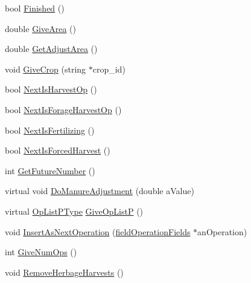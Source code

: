 \begin{DoxyCompactItemize}
\item 
bool \hyperlink{classplan_a336d1b751be876cf584e47d44826d8ac}{Finished} ()
\item 
double \hyperlink{classplan_a69ef07aba789edb9d649427e73dcc19c}{GiveArea} ()
\item 
double \hyperlink{classplan_aeac34b2dea2e779cf73477c0f9f263bb}{GetAdjustArea} ()
\item 
void \hyperlink{classplan_a46ca446bb7d23eff9d7f39d36b56d58b}{GiveCrop} (string $\ast$crop\_\-id)
\item 
bool \hyperlink{classplan_ad3c70afeed1b7ed1d00046ebbe3db961}{NextIsHarvestOp} ()
\item 
bool \hyperlink{classplan_aee2a49d25d0d0d0019d0b55465d3e4b1}{NextIsForageHarvestOp} ()
\item 
bool \hyperlink{classplan_a0d5099abca46e3a99902a0d333ce8a4d}{NextIsFertilizing} ()
\item 
bool \hyperlink{classplan_a5b8c3cccd2e9709b4d64d2910f778f9d}{NextIsForcedHarvest} ()
\item 
int \hyperlink{classplan_a8cd7e925bf86d2d2350a962b0392ae74}{GetFutureNumber} ()
\item 
virtual void \hyperlink{classplan_a1c083fe4c2f06097b7b57daf985996f1}{DoManureAdjustment} (double aValue)
\item 
virtual \hyperlink{classclone_list}{OpListPType} \hyperlink{classplan_a986121f5ba3cd52b3a728da6ccc9ce5b}{GiveOpListP} ()
\item 
void \hyperlink{classplan_a66bc896a7b501149627955ae025d62b0}{InsertAsNextOperation} (\hyperlink{classfield_operation_fields}{fieldOperationFields} $\ast$anOperation)
\item 
int \hyperlink{classplan_a2e5057eb3ec7c4ad4b20ac628f7ad1e9}{GiveNumOps} ()
\item 
void \hyperlink{classplan_a8a7b5b42e4b3ff4a705390733b2e38e2}{RemoveHerbageHarvests} ()
\end{DoxyCompactItemize}



